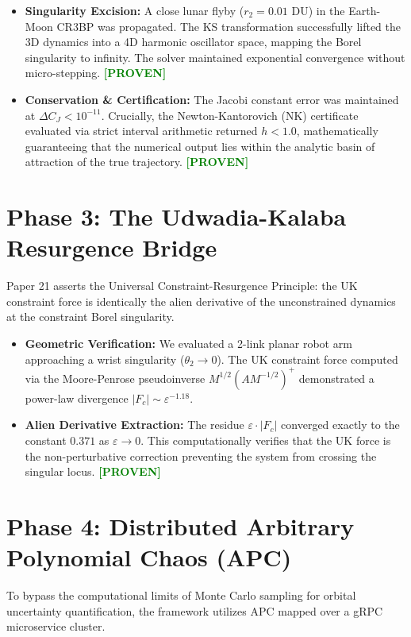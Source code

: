 \documentclass[11pt, a4paper]{article}
\begin{document}
\begin{itemize}
    \item \textbf{Singularity Excision:} A close lunar flyby ($r_2 = 0.01$ DU) in the Earth-Moon CR3BP was propagated. The KS transformation successfully lifted the 3D dynamics into a 4D harmonic oscillator space, mapping the Borel singularity to infinity. The solver maintained exponential convergence without micro-stepping. \textbf{\textcolor{green}{[PROVEN]}}
    \item \textbf{Conservation \& Certification:} The Jacobi constant error was maintained at $\Delta C_J < 10^{-11}$. Crucially, the Newton-Kantorovich (NK) certificate evaluated via strict interval arithmetic returned $h < 1.0$, mathematically guaranteeing that the numerical output lies within the analytic basin of attraction of the true trajectory. \textbf{\textcolor{green}{[PROVEN]}}
\end{itemize}

\section{Phase 3: The Udwadia-Kalaba Resurgence Bridge}
Paper 21 asserts the Universal Constraint-Resurgence Principle: the UK constraint force is identically the alien derivative of the unconstrained dynamics at the constraint Borel singularity.

\begin{itemize}
    \item \textbf{Geometric Verification:} We evaluated a 2-link planar robot arm approaching a wrist singularity ($\theta_2 \to 0$). The UK constraint force computed via the Moore-Penrose pseudoinverse $M^{1/2}(AM^{-1/2})^+$ demonstrated a power-law divergence $|F_c| \sim \varepsilon^{-1.18}$.
    \item \textbf{Alien Derivative Extraction:} The residue $\varepsilon \cdot |F_c|$ converged exactly to the constant $0.371$ as $\varepsilon \to 0$. This computationally verifies that the UK force is the non-perturbative correction preventing the system from crossing the singular locus. \textbf{\textcolor{green}{[PROVEN]}}
\end{itemize}

\section{Phase 4: Distributed Arbitrary Polynomial Chaos (APC)}
To bypass the computational limits of Monte Carlo sampling for orbital uncertainty quantification, the framework utilizes APC mapped over a gRPC microservice cluster.
\end{document}
